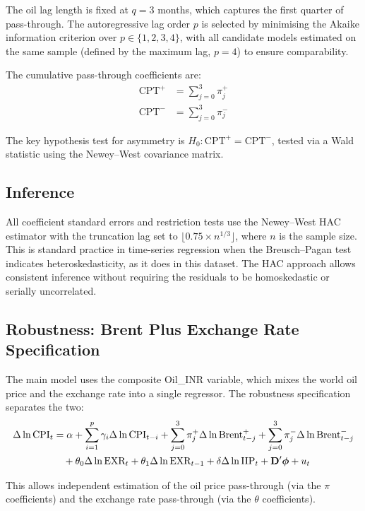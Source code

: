 The oil lag length is fixed at $q = 3$ months, which captures the first quarter of pass-through. The autoregressive lag order $p$ is selected by minimising the Akaike information criterion over $p \in \{1, 2, 3, 4\}$, with all candidate models estimated on the same sample (defined by the maximum lag, $p = 4$) to ensure comparability.

The cumulative pass-through coefficients are:
\begin{align}
\text{CPT}^+ &= \sum_{j=0}^{3} \pi^+_j \label{eq:cptpos} \\
\text{CPT}^- &= \sum_{j=0}^{3} \pi^-_j \label{eq:cptneg}
\end{align}

The key hypothesis test for asymmetry is $H_0: \text{CPT}^+ = \text{CPT}^-$, tested via a Wald statistic using the Newey--West covariance matrix.

\subsection{Inference}

All coefficient standard errors and restriction tests use the Newey--West HAC estimator \citep{newey1987} with the truncation lag set to $\lfloor 0.75 \times n^{1/3} \rfloor$, where $n$ is the sample size. This is standard practice in time-series regression when the Breusch--Pagan test indicates heteroskedasticity, as it does in this dataset. The HAC approach allows consistent inference without requiring the residuals to be homoskedastic or serially uncorrelated.

\subsection{Robustness: Brent Plus Exchange Rate Specification}

The main model uses the composite Oil\_INR variable, which mixes the world oil price and the exchange rate into a single regressor. The robustness specification separates the two:
\begin{align}
\Delta \ln \text{CPI}_t &= \alpha + \sum_{i=1}^{p} \gamma_i \Delta \ln \text{CPI}_{t-i}
  + \sum_{j=0}^{3} \pi^+_j \Delta \ln \text{Brent}^+_{t-j}
  + \sum_{j=0}^{3} \pi^-_j \Delta \ln \text{Brent}^-_{t-j} \notag \\
  &\quad + \theta_0 \Delta \ln \text{EXR}_t + \theta_1 \Delta \ln \text{EXR}_{t-1}
  + \delta \Delta \ln \text{IIP}_t + \mathbf{D}'\boldsymbol{\phi} + u_t
\label{eq:brentexr}
\end{align}

This allows independent estimation of the oil price pass-through (via the $\pi$ coefficients) and the exchange rate pass-through (via the $\theta$ coefficients).
